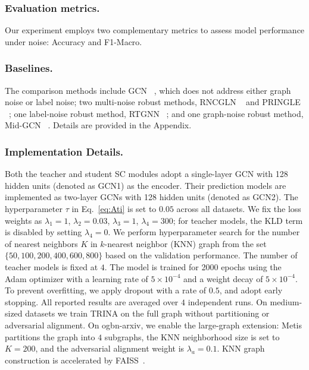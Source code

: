 \documentclass[sigconf, anonymous, review]{acmart}
\begin{document}
    \subsubsection{Evaluation metrics.}
      Our experiment employs two complementary metrics to assess model performance under noise:  Accuracy and F1-Macro.

    \subsubsection{Baselines.}
      The comparison methods include GCN ~\cite{kipf2016semi}, which does not address either graph noise or label noise; two multi-noise robust methods, RNCGLN ~\cite{zhu2024robust} and PRINGLE ~\cite{in2024noise}; one label-noise robust method, RTGNN ~\cite{qian2023robust}; and one graph-noise robust method, Mid-GCN ~\cite{huang2023robust}.  Details are provided in the Appendix.

    \subsubsection{Implementation Details.}
      Both the teacher and student SC modules adopt a single-layer GCN with 128 hidden units (denoted as GCN1) as the encoder. Their prediction models are implemented as two-layer GCNs with 128 hidden units (denoted as GCN2). The hyperparameter   \(\tau\) in Eq.~\ref{eq:Ati} is set to $0.05$ across all datasets. We fix the loss weights as \(\lambda_1 = 1\), \(\lambda_2 = 0.03\), \(\lambda_3 = 1\), \(\lambda_4 = 300\); for teacher models, the KLD term is disabled by setting 
      \(\lambda_4 = 0\).
      We perform hyperparameter search for the number of nearest neighbors \(K\) in $k$-nearest neighbor (KNN) graph from the set 
      \(\{50, 100, 200, 400, 600, 800\}\) based on the validation performance. The number of teacher models is fixed at $4$.
      The model is trained for 2000 epochs using the Adam optimizer with a learning rate of \(5 \times 10^{-4}\) and a weight decay of \(5 \times 10^{-4}\). To prevent overfitting, we apply dropout with a rate of  \(0.5\), and adopt early stopping. All reported results are averaged over $4$ independent runs.
      On medium-sized datasets we train TRINA on the full graph without partitioning or adversarial alignment. On ogbn-arxiv, we enable the large-graph extension: Metis partitions the graph into $4$ subgraphs, the KNN neighborhood size is set to $K{=}200$, and the adversarial alignment weight is $\lambda_a{=}0.1$. KNN graph construction is accelerated by FAISS~\cite{johnson2019billion}.
\end{document}
